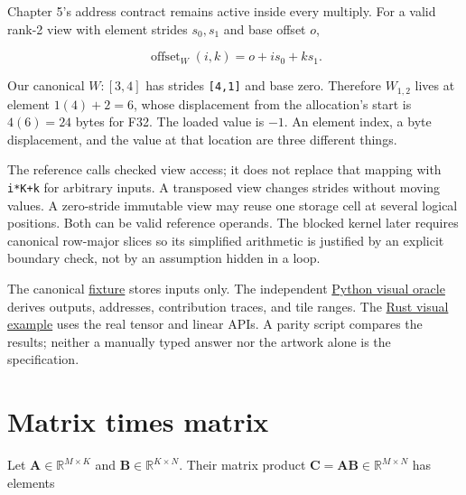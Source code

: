 Chapter 5's address contract remains active inside every multiply. For a
valid rank-2 view with element strides \(s_0,s_1\) and base offset
\(o\),

\begin{equation}
\operatorname{offset}_W(i,k)=o+i s_0+k s_1.
\end{equation}

Our canonical \(W:[3,4]\) has strides \texttt{{[}4,1{]}} and base zero.
Therefore \(W_{1,2}\) lives at element \(1(4)+2=6\), whose displacement
from the allocation's start is \(4(6)=24\) bytes for F32. The loaded
value is \(-1\). An element index, a byte displacement, and the value at
that location are three different things.


The reference calls checked view access; it does not replace that
mapping with \texttt{i*K+k} for arbitrary inputs. A transposed view
changes strides without moving values. A zero-stride immutable view may
reuse one storage cell at several logical positions. Both can be valid
reference operands. The blocked kernel later requires canonical
row-major slices so its simplified arithmetic is justified by an
explicit boundary check, not by an assumption hidden in a loop.

The canonical
\href{https://github.com/hermonai/inside-the-llm-engine/blob/astra-visual-rewrite/code/reference/fixtures/chapter06-visual.json}{fixture}
stores inputs only. The independent
\href{https://github.com/hermonai/inside-the-llm-engine/blob/astra-visual-rewrite/code/reference/python/chapter06_visual_oracle.py}{Python
visual oracle} derives outputs, addresses, contribution traces, and tile
ranges. The
\href{https://github.com/hermonai/inside-the-llm-engine/blob/astra-visual-rewrite/code/mini-engine/crates/engine0/examples/chapter06_visual_trace.rs}{Rust
visual example} uses the real tensor and linear APIs. A parity script
compares the results; neither a manually typed answer nor the artwork
alone is the specification.

\section{Matrix times matrix}\label{matrix-times-matrix}

Let \(\mathbf{A}\in\mathbb{R}^{M\times K}\) and
\(\mathbf{B}\in\mathbb{R}^{K\times N}\). Their matrix product
\(\mathbf{C}=\mathbf{A}\mathbf{B}\in\mathbb{R}^{M\times N}\) has
elements

